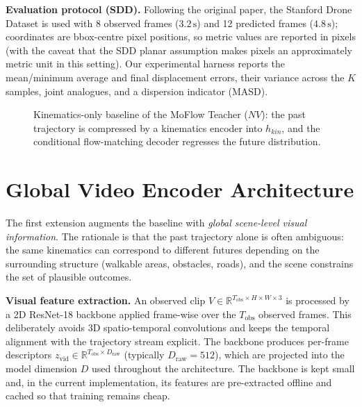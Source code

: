 \documentclass[11pt,a4paper]{article}
\begin{document}
\textbf{Evaluation protocol (SDD).} Following the original paper, the Stanford
Drone Dataset is used with 8 observed frames ($3.2\,\mathrm{s}$) and 12 predicted
frames ($4.8\,\mathrm{s}$); coordinates are bbox-centre pixel positions, so
metric values are reported in pixels (with the caveat that the SDD planar
assumption makes pixels an approximately metric unit in this setting). Our
experimental harness reports the mean/minimum average and final displacement
errors, their variance across the $K$ samples, joint analogues, and a dispersion
indicator (MASD).

\begin{figure}[htpb]
    \centering
    \resizebox{\textwidth}{!}{}
    \caption{Kinematics-only baseline of the MoFlow Teacher ($NV$): the past
    trajectory is compressed by a kinematics encoder into $h_{kin}$, and the
    conditional flow-matching decoder regresses the future distribution.
    \label{fig:arch-baseline}}
\end{figure}

\section{Global Video Encoder Architecture}
\label{sec:global}

The first extension augments the baseline with \emph{global scene-level visual
information}. The rationale is that the past trajectory alone is often
ambiguous: the same kinematics can correspond to different futures depending on
the surrounding structure (walkable areas, obstacles, roads), and the scene
constrains the set of plausible outcomes.

\textbf{Visual feature extraction.} An observed clip $V \in \mathbb{R}^{T_{\mathrm{obs}}
\times H \times W \times 3}$ is processed by a 2D ResNet-18 backbone applied
frame-wise over the $T_{\mathrm{obs}}$ observed frames. This deliberately avoids
3D spatio-temporal convolutions and keeps the temporal alignment with the
trajectory stream explicit. The backbone produces per-frame descriptors
$z_{\mathrm{vid}} \in \mathbb{R}^{T_{\mathrm{obs}} \times D_{\mathrm{raw}}}$
(typically $D_{\mathrm{raw}} = 512$), which are projected into the model
dimension $D$ used throughout the architecture. The backbone is kept small and,
in the current implementation, its features are pre-extracted offline and cached
so that training remains cheap.
\end{document}
